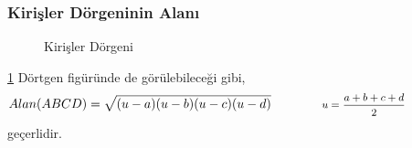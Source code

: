 \subsubsection{Kirişler Dörgeninin Alanı}
\begin{figure}[h!]
    \centering
    \caption{Kirişler Dörgeni}
    \label{fig:cyclicforarea}
\end{figure}

\ref{fig:cyclicforarea} Dörtgen figüründe de görülebileceği gibi, 
\begin{equation}
    Alan(ABCD) = \sqrt{(u-a)(u-b)(u-c)(u-d)} \qquad \qquad \parbox{4cm}{\footnotesize$\begin{aligned}
        u = \frac{a+b+c+d}{2}
    \end{aligned}$}
\end{equation}
geçerlidir.